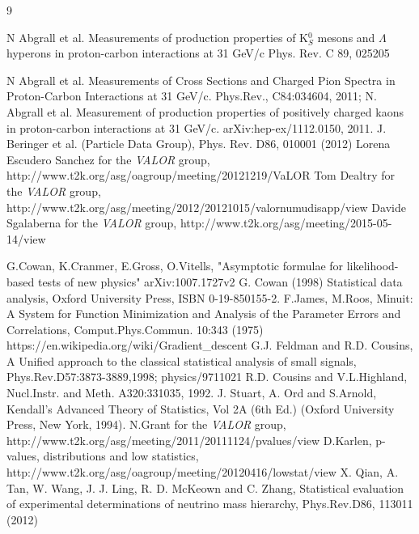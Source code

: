 \begin{thebibliography}{9}
%
%

  N Abgrall et al. Measurements of production properties of K$^{0}_{S}$ mesons and $\Lambda$ hyperons in proton-carbon interactions at 31 GeV/c
  Phys. Rev. C 89, 025205

  N Abgrall et al. Measurements of Cross Sections and Charged Pion Spectra in Proton-Carbon Interactions
  at 31 GeV/c. Phys.Rev., C84:034604, 2011;
  N. Abgrall et al. Measurement of production properties of positively charged kaons in proton-carbon
  interactions at 31 GeV/c. arXiv:hep-ex/1112.0150, 2011.
%
%
  J. Beringer et al. (Particle Data Group), Phys. Rev. D86, 010001 (2012)
%
%
  Lorena Escudero Sanchez for the {\em VALOR} group, 
  http://www.t2k.org/asg/oagroup/meeting/20121219/VaLOR%
  Tom Dealtry for the {\em VALOR} group,
  http://www.t2k.org/asg/meeting/2012/20121015/valornumudisapp/view
  Davide Sgalaberna for the {\em VALOR} group,
  http://www.t2k.org/asg/meeting/2015-05-14/view

%
%
G.Cowan, K.Cranmer, E.Gross, O.Vitells,
"Asymptotic formulae for likelihood-based tests of new physics"
arXiv:1007.1727v2
  G. Cowan (1998) Statistical data analysis, 
  Oxford University Press, ISBN 0-19-850155-2.
  F.James, M.Roos, Minuit: A System for Function Minimization and Analysis of the 
  Parameter Errors and Correlations, Comput.Phys.Commun. 10:343 (1975)
https://en.wikipedia.org/wiki/Gradient\_descent
  G.J. Feldman and R.D. Cousins,
  A Unified approach to the classical statistical analysis of small signals,
  Phys.Rev.D57:3873-3889,1998; physics/9711021
  R.D. Cousins and V.L.Highland, 
  Nucl.Instr. and Meth. A320:331035, 1992.
J. Stuart, A. Ord and S.Arnold,
Kendall's Advanced Theory of Statistics, Vol 2A (6th Ed.) 
(Oxford University Press, New York, 1994).
 N.Grant for the {\em VALOR} group,
 http://www.t2k.org/asg/meeting/2011/20111124/pvalues/view
 D.Karlen,
 p-values, distributions and low statistics,
 http://www.t2k.org/asg/oagroup/meeting/20120416/lowstat/view
 X. Qian, A. Tan, W. Wang, J. J. Ling, R. D. McKeown and C. Zhang,
 Statistical evaluation of experimental determinations of neutrino mass hierarchy,
 Phys.Rev.D86, 113011 (2012)
 

\end{thebibliography}
